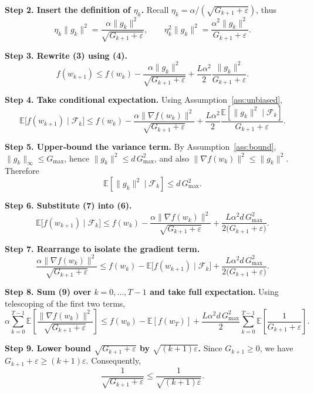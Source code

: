 \documentclass[11pt]{article}
\newcommand{\E}{\mathbb{E}}
\begin{document}
\noindent\textbf{Step 2. Insert the definition of $\eta_{k}$.}  
Recall $\eta_{k}= \alpha/( \sqrt{G_{k+1}+\varepsilon})$, thus
\[
\eta_{k}\|g_{k}\|^{2}= \frac{\alpha\|g_{k}\|^{2}}{\sqrt{G_{k+1}+\varepsilon}},\qquad
\eta_{k}^{2}\|g_{k}\|^{2}= \frac{\alpha^{2}\|g_{k}\|^{2}}{G_{k+1}+\varepsilon}.
\tag{4}
\]

\noindent\textbf{Step 3. Rewrite (3) using (4).}
\[
f(w_{k+1})\le f(w_{k})
-\frac{\alpha\|g_{k}\|^{2}}{\sqrt{G_{k+1}+\varepsilon}}
+\frac{L\alpha^{2}}{2}\frac{\|g_{k}\|^{2}}{G_{k+1}+\varepsilon}.
\tag{5}
\]

\noindent\textbf{Step 4. Take conditional expectation.}  
Using Assumption~\ref{ass:unbiased},
\[
\E\!\bigl[f(w_{k+1})\mid\mathcal{F}_{k}\bigr]
\le f(w_{k})
-\frac{\alpha\|\nabla f(w_{k})\|^{2}}{\sqrt{G_{k+1}+\varepsilon}}
+\frac{L\alpha^{2}}{2}\frac{\E[\|g_{k}\|^{2}\mid\mathcal{F}_{k}]}{G_{k+1}+\varepsilon}.
\tag{6}
\]

\noindent\textbf{Step 5. Upper‑bound the variance term.}  
By Assumption~\ref{ass:bound}, $\|g_{k}\|_{\infty}\le G_{\max}$, hence
$\|g_{k}\|^{2}\le d\,G_{\max}^{2}$, and also $\|\nabla f(w_{k})\|^{2}\le
\|g_{k}\|^{2}$.  Therefore
\[
\E[\|g_{k}\|^{2}\mid\mathcal{F}_{k}]
\le d\,G_{\max}^{2}.
\tag{7}
\]

\noindent\textbf{Step 6. Substitute (7) into (6).}
\[
\E\!\bigl[f(w_{k+1})\mid\mathcal{F}_{k}\bigr]
\le f(w_{k})
-\frac{\alpha\|\nabla f(w_{k})\|^{2}}{\sqrt{G_{k+1}+\varepsilon}}
+\frac{L\alpha^{2}d\,G_{\max}^{2}}{2\bigl(G_{k+1}+\varepsilon\bigr)}.
\tag{8}
\]

\noindent\textbf{Step 7. Rearrange to isolate the gradient term.}
\[
\frac{\alpha\|\nabla f(w_{k})\|^{2}}{\sqrt{G_{k+1}+\varepsilon}}
\le f(w_{k})-\E\!\bigl[f(w_{k+1})\mid\mathcal{F}_{k}\bigr]
+\frac{L\alpha^{2}d\,G_{\max}^{2}}{2\bigl(G_{k+1}+\varepsilon\bigr)}.
\tag{9}
\]

\noindent\textbf{Step 8. Sum (9) over $k=0,\dots,T-1$ and take full expectation.}
Using telescoping of the first two terms,
\[
\alpha\sum_{k=0}^{T-1}
\E\!\left[\frac{\|\nabla f(w_{k})\|^{2}}{\sqrt{G_{k+1}+\varepsilon}}\right]
\le f(w_{0})- \E[f(w_{T})]
+\frac{L\alpha^{2}d\,G_{\max}^{2}}{2}
\sum_{k=0}^{T-1}\E\!\left[\frac{1}{G_{k+1}+\varepsilon}\right].
\tag{10}
\]

\noindent\textbf{Step 9. Lower bound $\sqrt{G_{k+1}+\varepsilon}$ by $\sqrt{(k+1)\varepsilon}$.}  
Since $G_{k+1}\ge0$, we have $G_{k+1}+\varepsilon\ge (k+1)\varepsilon$.
Consequently,
\[
\frac{1}{\sqrt{G_{k+1}+\varepsilon}}\le \frac{1}{\sqrt{(k+1)\varepsilon}}.
\tag{11}
\]
\end{document}
